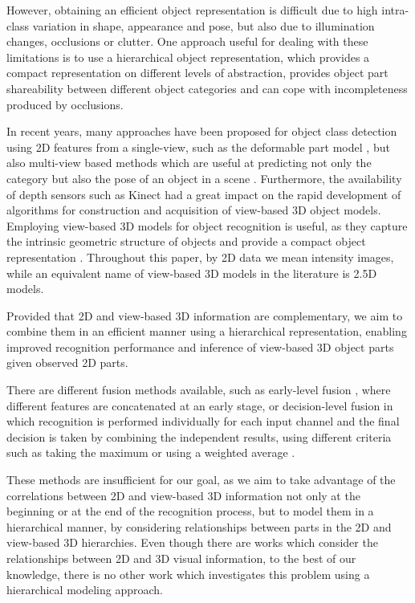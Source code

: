 \documentclass[runningheads]{llncs}
\begin{document}
However, obtaining an efficient object representation is difficult due to high intra-class variation in shape, appearance and pose, but also due to illumination changes, occlusions or clutter. One approach useful for dealing with these limitations is to use a hierarchical object representation, which provides a compact representation on different levels of abstraction, provides object part shareability between different object categories and can cope with incompleteness produced by occlusions.

In recent years, many approaches have been proposed for object class detection using 2D features from a single-view, such as the deformable part model \cite{Felzenswalb2010}, but also multi-view based methods which are useful at predicting not only the category but also the pose of an object in a scene \cite{Teney2014}. Furthermore, the availability of depth sensors such as Kinect had a great impact on the rapid development of algorithms for construction and acquisition of view-based 3D object models. Employing view-based 3D models for object recognition is useful, as they capture the intrinsic geometric structure of objects and provide a compact object representation \cite{Liebelt2010}. Throughout this paper, by 2D data we mean intensity images, while an equivalent name of view-based 3D models in the literature is 2.5D models.

Provided that 2D and view-based 3D information are complementary, we aim to combine them in an efficient manner using a hierarchical representation, enabling improved recognition performance and inference of view-based 3D object parts given observed 2D parts. 

There are different fusion methods available, such as early-level fusion \cite{Arca2007}, where different features are concatenated at an early stage, or decision-level fusion \cite{Soltana2010} in which recognition is performed individually for each input channel and the final decision is taken by combining the independent results, using different criteria such as taking the maximum or using a weighted average \cite{Mahmoudi2013}.

These methods are insufficient for our goal, as we aim to take advantage of the correlations between 2D and view-based 3D information not only at the beginning or at the end of the recognition process, but to model them in a hierarchical manner, by considering relationships between parts in the 2D and view-based 3D hierarchies. Even though there are works which consider the relationships between 2D and 3D visual information, to the best of our knowledge, there is no other work which investigates this problem using a hierarchical modeling approach.
\end{document}
